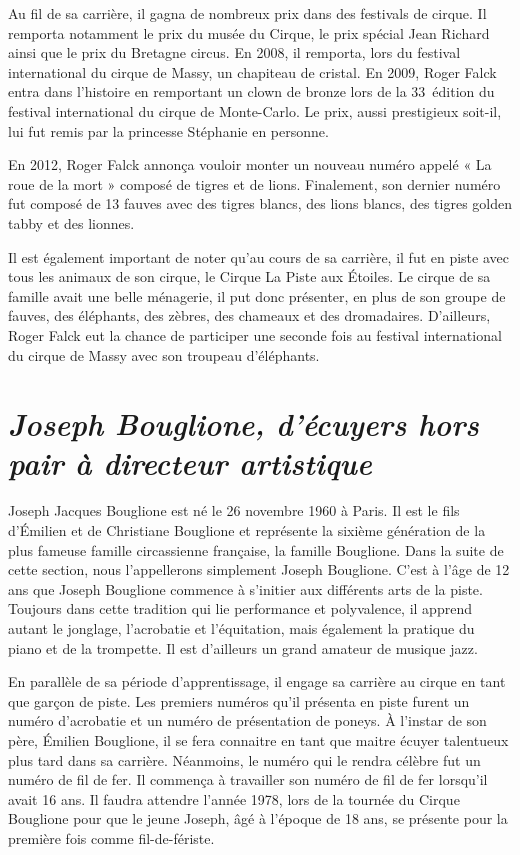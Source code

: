 Au fil de sa carrière, il gagna de nombreux prix dans des festivals de cirque. Il remporta notamment le prix du musée du Cirque, le prix spécial Jean Richard ainsi que le prix du Bretagne circus. En 2008, il remporta, lors du festival international du cirque de Massy, un chapiteau de cristal.  En 2009, Roger Falck entra dans l’histoire en remportant un clown de bronze lors de la 33\ieme~édition du festival international du cirque de Monte-Carlo. Le prix, aussi prestigieux soit-il, lui fut remis par la princesse Stéphanie en personne.

En 2012, Roger Falck annonça vouloir monter un nouveau numéro appelé « La roue de la mort » composé de tigres et de lions. Finalement, son dernier numéro fut composé de 13 fauves avec des tigres blancs, des lions blancs, des tigres golden tabby et des lionnes.

Il est également important de noter qu’au cours de sa carrière, il fut en piste avec tous les animaux de son cirque, le Cirque La Piste aux Étoiles. Le cirque de sa famille avait une belle ménagerie, il put donc présenter, en plus de son groupe de fauves, des éléphants, des zèbres, des chameaux et des dromadaires. D’ailleurs, Roger Falck eut la chance de participer une seconde fois au festival international du cirque de Massy avec son troupeau d’éléphants.

\section*{\textit{Joseph Bouglione, d’écuyers hors pair à directeur artistique}}
{}
Joseph Jacques Bouglione est né le 26 novembre 1960 à Paris. Il est le fils d'Émilien et de Christiane Bouglione et représente la sixième génération de la plus fameuse famille circassienne française, la famille Bouglione. Dans la suite de cette section, nous l’appellerons simplement Joseph Bouglione. C’est à l’âge de 12 ans que Joseph Bouglione commence à s’initier aux différents arts de la piste. Toujours dans cette tradition qui lie performance et polyvalence, il apprend autant le jonglage, l’acrobatie et l’équitation, mais également la pratique du piano et de la trompette. Il est d’ailleurs un grand amateur de musique jazz.

En parallèle de sa période d’apprentissage, il engage sa carrière au cirque en tant que garçon de piste. Les premiers numéros qu’il présenta en piste furent un numéro d’acrobatie et un numéro de présentation de poneys. À l’instar de son père, Émilien Bouglione, il se fera connaitre en tant que maitre écuyer talentueux plus tard dans sa carrière. Néanmoins, le numéro qui le rendra célèbre fut un numéro de fil de fer. Il commença à travailler son numéro de fil de fer lorsqu’il avait 16 ans. Il faudra attendre l’année 1978, lors de la tournée du Cirque Bouglione pour que le jeune Joseph, âgé à l’époque de 18 ans, se présente pour la première fois comme fil-de-fériste.

